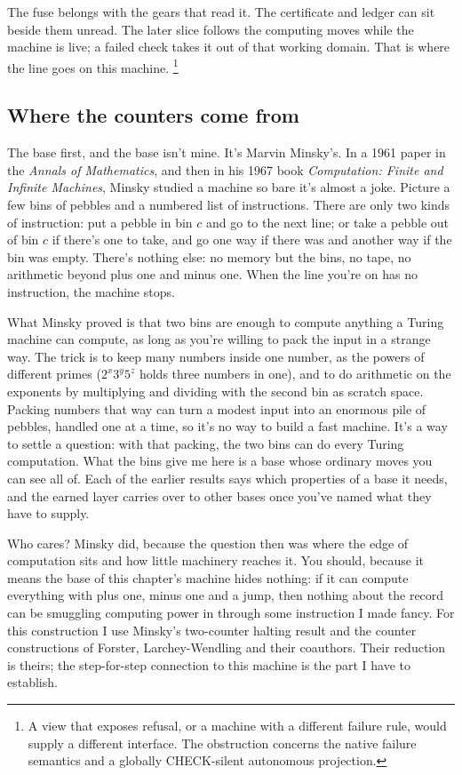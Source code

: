 \documentclass[11pt,twoside]{article}
\theoremstyle{thielethm}
\theoremstyle{thieledef}
\theoremstyle{thieledef}
\theoremstyle{thieledef}
\theoremstyle{thielethm}
\theoremstyle{thieleobs}
\theoremstyle{thielethm}
\begin{document}
The fuse belongs with the gears that read it. The certificate and ledger can sit beside
them unread. The later slice follows the computing moves while the machine is live;
a failed check takes it out of that working domain. That is where the line goes on
this machine.
\footnote{A view that exposes refusal, or a machine with a different failure rule,
would supply a different interface. The obstruction concerns the native failure
semantics and a globally CHECK-silent autonomous projection.}

\subsection{Where the counters come from}
\label{sec:counters-origin}

The base first, and the base isn't mine. It's Marvin Minsky's. In a 1961 paper in the
\emph{Annals of Mathematics}, and then in his 1967 book \emph{Computation: Finite and Infinite
Machines}, Minsky studied a machine so bare it's almost a joke. Picture a few bins of
pebbles and a numbered list of instructions. There are only two kinds of instruction: put
a pebble in bin $c$ and go to the next line; or take a pebble out of bin $c$ if there's one to
take, and go one way if there was and another way if the bin was empty. There's nothing else: no memory but
the bins, no tape, no arithmetic beyond plus one and minus one. When the line you're on has no
instruction, the machine stops.

What Minsky proved is that two bins are enough to compute anything a Turing machine can
compute, as long as you're willing to pack the input in a strange way. The trick is to keep
many numbers inside one number, as the powers of different primes ($2^x 3^y 5^z$ holds
three numbers in one), and to do arithmetic on the exponents by multiplying and dividing
with the second bin as scratch space. Packing numbers that way can turn a modest input
into an enormous pile of pebbles, handled one at a time, so it's no way to build a fast
machine. It's a way to settle a question: with that packing, the two bins can do every
Turing computation. What the bins give me here is a base whose ordinary moves you can see
all of. Each of the earlier results says which properties of a base it needs, and
the earned layer carries over to other bases once you've named
what they have to supply.

Who cares? Minsky did, because the question then was where the edge of computation sits and
how little machinery reaches it. You should, because it means the base of this chapter's
machine hides nothing: if it can compute everything with plus one, minus one and a jump,
then nothing about the record can be smuggling computing power in through some instruction
I made fancy. For this construction I use Minsky's two-counter halting result and the counter constructions of Forster, Larchey-Wendling and their coauthors. Their reduction is theirs; the step-for-step connection to this machine is the part I have to establish.
\end{document}
